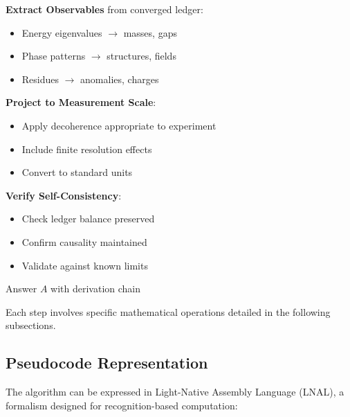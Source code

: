 \documentclass[12pt,a4paper]{article}
\begin{document}
\begin{algorithm}
\begin{algorithmic}[1]
\STATE \textbf{Extract Observables} from converged ledger:
    \begin{itemize}
    \item Energy eigenvalues $\rightarrow$ masses, gaps
    \item Phase patterns $\rightarrow$ structures, fields  
    \item Residues $\rightarrow$ anomalies, charges
    \end{itemize}

\STATE \textbf{Project to Measurement Scale}:
    \begin{itemize}
    \item Apply decoherence appropriate to experiment
    \item Include finite resolution effects
    \item Convert to standard units
    \end{itemize}

\STATE \textbf{Verify Self-Consistency}:
    \begin{itemize}
    \item Check ledger balance preserved
    \item Confirm causality maintained
    \item Validate against known limits
    \end{itemize}

\RETURN Answer $A$ with derivation chain
\end{algorithmic}
\end{algorithm}

Each step involves specific mathematical operations detailed in the following subsections.

\subsection{Pseudocode Representation}

The algorithm can be expressed in Light-Native Assembly Language (LNAL), a formalism designed for recognition-based computation:
\end{document}

